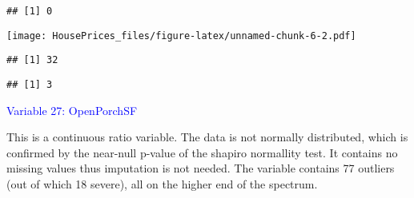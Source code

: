 \documentclass[
]{article}
\newenvironment{Shaded}{\begin{snugshade}}{\end{snugshade}}
\newcommand{\AttributeTok}[1]{\textcolor[rgb]{0.13,0.29,0.53}{#1}}
\newcommand{\CommentTok}[1]{\textcolor[rgb]{0.56,0.35,0.01}{\textit{#1}}}
\newcommand{\ConstantTok}[1]{\textcolor[rgb]{0.56,0.35,0.01}{#1}}
\newcommand{\DecValTok}[1]{\textcolor[rgb]{0.00,0.00,0.81}{#1}}
\newcommand{\FloatTok}[1]{\textcolor[rgb]{0.00,0.00,0.81}{#1}}
\newcommand{\FunctionTok}[1]{\textcolor[rgb]{0.13,0.29,0.53}{\textbf{#1}}}
\newcommand{\NormalTok}[1]{#1}
\newcommand{\OtherTok}[1]{\textcolor[rgb]{0.56,0.35,0.01}{#1}}
\newcommand{\SpecialCharTok}[1]{\textcolor[rgb]{0.81,0.36,0.00}{\textbf{#1}}}
\begin{document}
\begin{Shaded}
\end{Shaded}

\begin{verbatim}
## [1] 0
\end{verbatim}

\begin{Shaded}
\end{Shaded}

\texttt{[image: HousePrices\_files/figure-latex/unnamed-chunk-6-2.pdf]}

\begin{verbatim}
## [1] 32
\end{verbatim}

\begin{Shaded}
\end{Shaded}

\begin{verbatim}
## [1] 3
\end{verbatim}

\textcolor{blue}{Variable 27: OpenPorchSF}

This is a continuous ratio variable. The data is not normally
distributed, which is confirmed by the near-null p-value of the shapiro
normallity test. It contains no missing values thus imputation is not
needed. The variable contains 77 outliers (out of which 18 severe), all
on the higher end of the spectrum.
\end{document}
